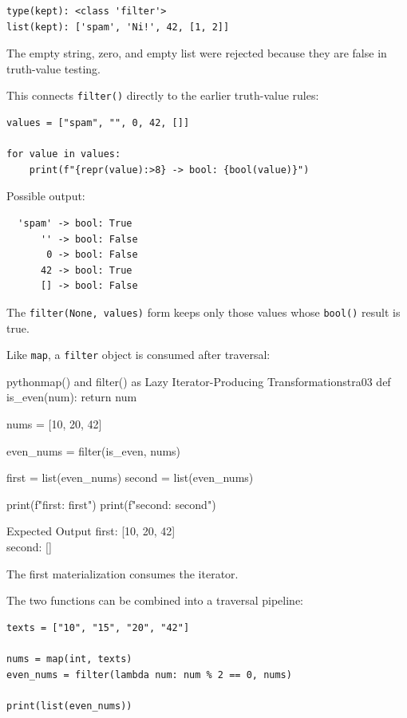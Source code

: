 \begin{verbatim}
type(kept): <class 'filter'>
list(kept): ['spam', 'Ni!', 42, [1, 2]]
\end{verbatim}

The empty string, zero, and empty list were rejected because they are false in truth-value testing.

This connects \texttt{filter()} directly to the earlier truth-value rules:

\begin{verbatim}
values = ["spam", "", 0, 42, []]

for value in values:
    print(f"{repr(value):>8} -> bool: {bool(value)}")
\end{verbatim}

Possible output:

\begin{verbatim}
  'spam' -> bool: True
      '' -> bool: False
       0 -> bool: False
      42 -> bool: True
      [] -> bool: False
\end{verbatim}

The \texttt{filter(None, values)} form keeps only those values whose \texttt{bool()} result is true.

Like \texttt{map}, a \texttt{filter} object is consumed after traversal:

\begin{codebox}[]{python}{map() and filter() as Lazy Iterator-Producing Transformations}{tra03}
def is_even(num):
    return num %

nums = [10, 20, 42]

even_nums = filter(is_even, nums)

first = list(even_nums)
second = list(even_nums)

print(f"first: {first}")
print(f"second: {second}")
\end{codebox}


\begin{iobox}{Expected Output}
first: [10, 20, 42] \\
second: [] \\
\end{iobox}




The first materialization consumes the iterator.

The two functions can be combined into a traversal pipeline:

\begin{verbatim}
texts = ["10", "15", "20", "42"]

nums = map(int, texts)
even_nums = filter(lambda num: num % 2 == 0, nums)

print(list(even_nums))
\end{verbatim}

